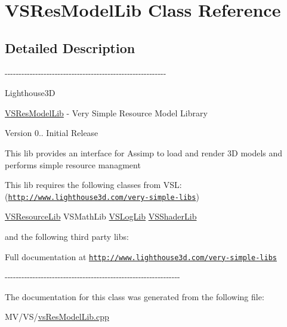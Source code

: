 \hypertarget{class_v_s_res_model_lib}{\section{\-V\-S\-Res\-Model\-Lib \-Class \-Reference}
\label{class_v_s_res_model_lib}
}


\subsection{\-Detailed \-Description}
-\/-\/-\/-\/-\/-\/-\/-\/-\/-\/-\/-\/-\/-\/-\/-\/-\/-\/-\/-\/-\/-\/-\/-\/-\/-\/-\/-\/-\/-\/-\/-\/-\/-\/-\/-\/-\/-\/-\/-\/-\/-\/-\/-\/-\/-\/-\/-\/-\/-\/-\/-\/-\/-\/-\/-\/-\/-\/

\-Lighthouse3\-D

\hyperlink{class_v_s_res_model_lib}{\-V\-S\-Res\-Model\-Lib} -\/ \-Very \-Simple \-Resource \-Model \-Library

\begin{DoxyVersion}{\-Version}
0.. \-Initial \-Release
\end{DoxyVersion}
\-This lib provides an interface for \-Assimp to load and render 3\-D models and performs simple resource managment

\-This lib requires the following classes from \-V\-S\-L\-: (\href{http://www.lighthouse3d.com/very-simple-libs}{\tt http\-://www.\-lighthouse3d.\-com/very-\/simple-\/libs})

\hyperlink{class_v_s_resource_lib}{\-V\-S\-Resource\-Lib} \-V\-S\-Math\-Lib \hyperlink{class_v_s_log_lib}{\-V\-S\-Log\-Lib} \hyperlink{class_v_s_shader_lib}{\-V\-S\-Shader\-Lib}

and the following third party libs\-:

\-Full documentation at \href{http://www.lighthouse3d.com/very-simple-libs}{\tt http\-://www.\-lighthouse3d.\-com/very-\/simple-\/libs}

-\/-\/-\/-\/-\/-\/-\/-\/-\/-\/-\/-\/-\/-\/-\/-\/-\/-\/-\/-\/-\/-\/-\/-\/-\/-\/-\/-\/-\/-\/-\/-\/-\/-\/-\/-\/-\/-\/-\/-\/-\/-\/-\/-\/-\/-\/-\/-\/-\/-\/-\/-\/-\/-\/-\/-\/-\/-\/-\/-\/-\/-\/-\/ 

\-The documentation for this class was generated from the following file\-:\begin{DoxyCompactItemize}
\item 
\-M\-V/\-V\-S/\hyperlink{vs_res_model_lib_8cpp}{vs\-Res\-Model\-Lib.\-cpp}\end{DoxyCompactItemize}

